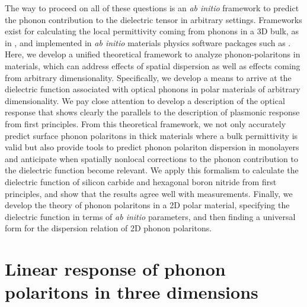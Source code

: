 \documentclass[aps,prb,twocolumn,
	groupedaddress,superscriptaddress,
	amsfonts,amssymb,amsmath,floatfix,
	citeautoscript]{revtex4-1}
\begin{document}
The way to proceed on all of these questions is an \emph{ab initio} framework to predict the phonon contribution to the dielectric tensor in arbitrary settings. Frameworks exist for calculating the local permittivity coming from phonons in a 3D bulk, as in \cite{Gonze1997dynamical}, and implemented in \emph{ab initio} materials physics software packages such as \cite{abinit1,abinit2,abinit3}. Here, we develop a unified 
theoretical framework to analyze phonon-polaritons in materials, which can address effects of spatial dispersion as well as effects coming from arbitrary dimensionality. Specifically, we develop a means to arrive at the dielectric function associated with optical phonons in polar materials of arbitrary dimensionality. We pay close attention to develop a description of the optical response that shows clearly the parallels to the description of plasmonic response from first principles. From this theoretical framework, we not only accurately predict surface phonon polaritons in thick materials where a bulk permittivity is valid but also provide tools to predict phonon polariton dispersion in monolayers and anticipate when spatially nonlocal corrections to the phonon contribution to the dielectric function become relevant. We apply this formalism to calculate the dielectric function of silicon carbide and hexagonal boron nitride from first principles, and show that the results agree well with measurements. Finally, we develop the theory of phonon polaritons in a 2D polar material, specifying the dielectric function in terms of \emph{ab initio} parameters, and then finding a universal form for the dispersion relation of 2D phonon polaritons.

\section{Linear response of phonon polaritons in three dimensions}
\end{document}

